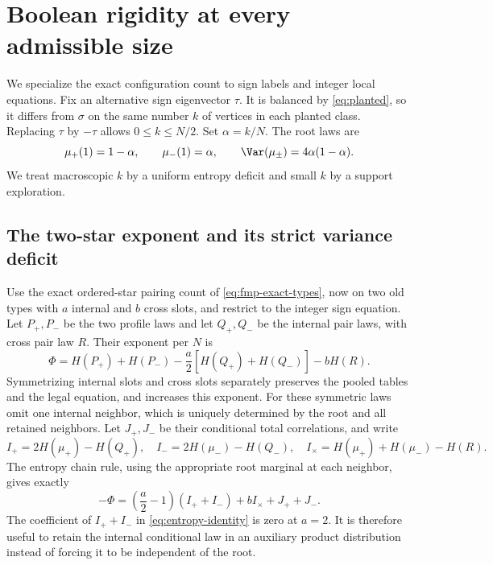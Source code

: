 \section{Boolean rigidity at every admissible size}\label{sec:rigidity}

We specialize the exact configuration count to sign labels and integer
local equations. Fix an alternative sign eigenvector $\tau$. It is balanced
by \eqref{eq:planted}, so it differs from $\sigma$ on the same number
$k$ of vertices in each planted class. Replacing $\tau$ by $-\tau$
allows $0\le k\le N/2$. Set $\alpha=k/N$. The root laws are
\begin{equation}\label{eq:sign-laws}
 \mu_+(1)=1-\alpha,\qquad \mu_-(1)=\alpha,
 \qquad \Var(\mu_\pm)=4\alpha(1-\alpha).
\end{equation}
We treat macroscopic $k$ by a uniform entropy deficit and small $k$
by a support exploration.

\subsection{The two-star exponent and its strict variance deficit}
Use the exact ordered-star pairing count of
\eqref{eq:fmp-exact-types}, now on two old types with $a$ internal
and $b$ cross slots, and restrict to the integer sign equation.
Let $P_+,P_-$ be the two profile laws and let $Q_+,Q_-$ be the
internal pair laws, with cross pair law $R$. Their exponent per $N$ is
\[
 \Phi=H(P_+)+H(P_-)-\frac a2[H(Q_+)+H(Q_-)]-bH(R).
\]
Symmetrizing internal slots and cross slots separately preserves the
pooled tables and the legal equation, and increases this exponent.
For these symmetric laws omit one internal neighbor, which is uniquely
determined by the root and all retained neighbors. Let $J_+,J_-$
be their conditional total correlations, and write
\[
 I_+=2H(\mu_+)-H(Q_+),\quad I_-=2H(\mu_-)-H(Q_-),\quad
 I_\times=H(\mu_+)+H(\mu_-)-H(R).
\]
The entropy chain rule, using the appropriate root marginal at each
neighbor, gives exactly
\begin{equation}\label{eq:entropy-identity}
 -\Phi=\left(\frac a2-1\right)(I_++I_-)
                      +bI_\times+J_++J_-.
\end{equation}
The coefficient of $I_++I_-$ in \eqref{eq:entropy-identity} is zero
at $a=2$. It is therefore useful to retain the internal conditional
law in an auxiliary product distribution instead of forcing it to be
independent of the root.

